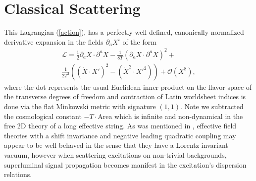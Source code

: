 \documentclass[%
 reprint,
 amsmath,amssymb,
 aps,
]{revtex4-1}
\begin{document}
\section{Classical Scattering}

This Lagrangian (\ref{action}), has a perfectly well defined, canonically normalized derivative expansion in the fields
$\partial_{a}X^i$ of the form
\begin{eqnarray}
    \mathcal{L} = \frac{1}{2} \partial_{a} X \cdot \partial^{a} X - \frac{1}{8 T}
    (\partial_{a} X \cdot \partial^{a} X)^2 + \nonumber \\
    \frac{1}{2 T^2} ((\dot{X} \cdot X')^2 - (\dot{X}^2 \cdot X'^2)) + \mathcal{O}(X^8) , \nonumber
\end{eqnarray}
where the dot represents the usual Euclidean inner product on the flavor space of the transverse degrees of freedom and
contraction of Latin worldsheet indices is done via the flat Minkowski metric with signature $(1,1)$. Note we subtracted
the cosmological constant $-T \cdot \mathrm{Area}$ which is infinite and non-dynamical in the free 2D theory of a long
effective string. As was mentioned in \cite{Adams:2006sv}, effective field theories with a shift invariance and negative
leading quadratic coupling may appear to be well behaved in the sense that they have a Lorentz invariant vacuum, however
when scattering excitations on non-trivial backgrounds, superluminal signal propagation becomes manifest in the
excitation's dispersion relations.
\end{document}
